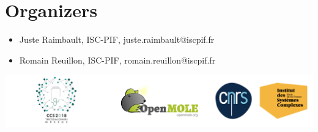 \documentclass[11pt]{article}
\begin{document}
\section*{Organizers}

\begin{itemize}
	\item Juste Raimbault, ISC-PIF, juste.raimbault@iscpif.fr
	\item Romain Reuillon, ISC-PIF, romain.reuillon@iscpif.fr
\end{itemize}


\vspace{1cm}

\centering
\includegraphics[width=\linewidth]{logos}







%
%
\end{document}
